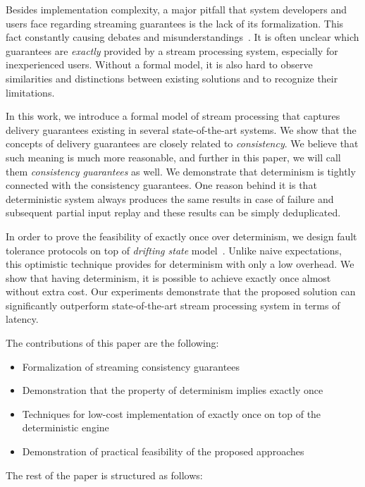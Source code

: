 Besides implementation complexity, a major pitfall that system developers and users face regarding streaming guarantees is the lack of its formalization. This fact constantly causing debates and misunderstandings~\cite{JerryPengStreamIO, PaperTrail}. It is often unclear which guarantees are {\em exactly} provided by a stream processing system, especially for inexperienced users. Without a formal model, it is also hard to observe similarities and distinctions between existing solutions and to recognize their limitations.

In this work, we introduce a formal model of stream processing that captures delivery guarantees existing in several state-of-the-art systems. We show that the concepts of delivery guarantees are closely related to {\em consistency}. We believe that such meaning is much more reasonable, and further in this paper, we will call them {\em consistency guarantees} as well. We demonstrate that determinism is tightly connected with the consistency guarantees. One reason behind it is that deterministic system always produces the same results in case of failure and subsequent partial input replay and these results can be simply deduplicated.

In order to prove the feasibility of exactly once over determinism, we design fault tolerance protocols on top of {\em drifting state} model~\cite{we2018adbis}. Unlike naive expectations, this optimistic technique provides for determinism with only a low overhead. We show that having determinism, it is possible to achieve exactly once almost without extra cost. Our experiments demonstrate that the proposed solution can significantly outperform state-of-the-art stream processing system in terms of latency.

The contributions of this paper are the following: 
\begin{itemize}
    \item Formalization of streaming consistency guarantees 
    \item Demonstration that the property of determinism implies exactly once
    \item Techniques for low-cost implementation of exactly once on top of the deterministic engine
    \item Demonstration of practical feasibility of the proposed approaches
\end{itemize}

The rest of the paper is structured as follows: 
